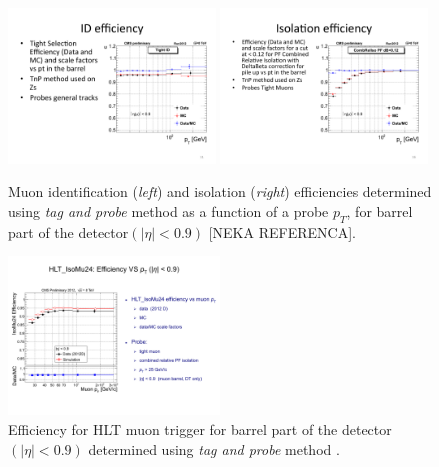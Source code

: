 \begin{figure}[htbp]
	\centering
		\includegraphics[width=0.49\textwidth]{Figures/ID_eff.pdf}
		\includegraphics[width=0.49\textwidth]{Figures/ISO_eff.pdf}
	\caption[Muon identification and isolation efficiencies using \textit{tag and probe} method.]{Muon identification (\textit{left}) and isolation (\textit{right}) efficiencies determined using \textit{tag and probe} method as a function of a probe $p_T$, for barrel part of the detector$(|\eta|<0.9)$ [NEKA REFERENCA].}
	\label{fig:eff_IDISO}
\end{figure}

\begin{figure}[htbp]
	\centering
		\includegraphics[width=0.5\textwidth]{Figures/trig_eff.pdf}
	\caption[Muon trigger efficiency using \textit{tag and probe} method.]{Efficiency for HLT muon trigger for barrel part of the detector $(|\eta|<0.9)$ determined using \textit{tag and probe} method .}
	\label{fig:eff_trig}
\end{figure}  

